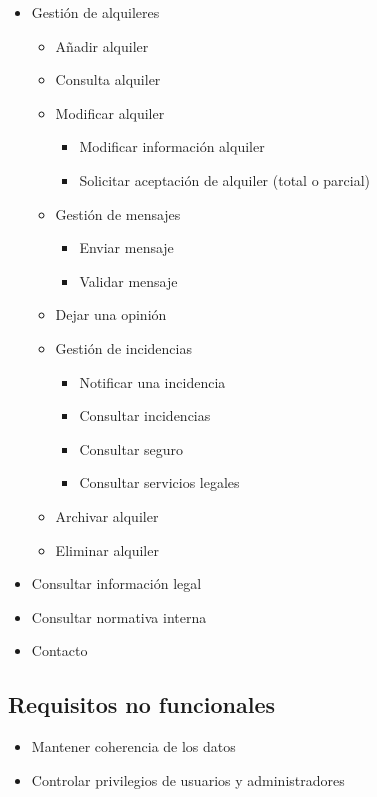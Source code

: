 \documentclass[11pt,spanish]{article} %
\begin{document}
\begin{itemize}
	\item Gestión de alquileres
	\begin{itemize}
		\item Añadir alquiler
		\item Consulta alquiler
		\item Modificar alquiler
		\begin{itemize}
			\item Modificar información alquiler
			\item Solicitar aceptación de alquiler (total o parcial)
		\end{itemize}
		\item Gestión de mensajes
		\begin{itemize}
			\item Enviar mensaje
			\item Validar mensaje
		\end{itemize}
		\item Dejar una opinión
		\item Gestión de incidencias
		\begin{itemize}
			\item Notificar una incidencia 
			\item Consultar incidencias
			\item Consultar seguro
			\item Consultar servicios legales		
		\end{itemize}
		\item Archivar alquiler
		\item Eliminar alquiler
	\end{itemize}
	
	\item Consultar información legal
	\item Consultar normativa interna
	\item Contacto
	
	
\end{itemize}

\subsection{Requisitos no funcionales}
\begin{itemize}
	\item Mantener coherencia de los datos
	\item Controlar privilegios de usuarios y administradores
	
\end{itemize}
\end{document}
